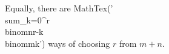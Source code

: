 \documentclass[preview]{standalone}
\begin{document}
\begin{center}
Equally, there are MathTex('\\sum_{k=0}^{r}\\binom{n}{r-k}\\binom{m}{k}') ways of choosing $r$ from $m+n$.
\end{center}
\end{document}
